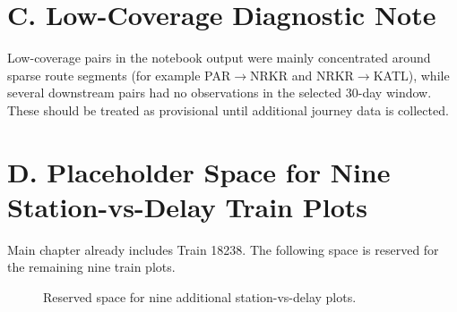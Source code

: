 \documentclass[12pt,a4paper]{report}
\begin{document}


\section*{C. Low-Coverage Diagnostic Note}
Low-coverage pairs in the notebook output were mainly concentrated around sparse route segments (for example PAR$\rightarrow$NRKR and NRKR$\rightarrow$KATL), while several downstream pairs had no observations in the selected 30-day window. These should be treated as provisional until additional journey data is collected.

\section*{D. Placeholder Space for Nine Station-vs-Delay Train Plots}
Main chapter already includes Train 18238. The following space is reserved for the remaining nine train plots.
\begin{figure}[H]
\centering
{}
\caption{Reserved space for nine additional station-vs-delay plots.}
\end{figure}
\end{document}
